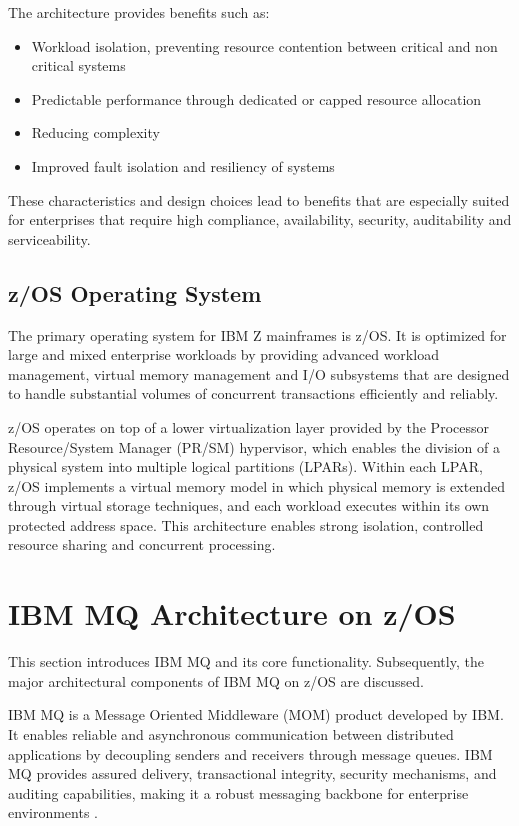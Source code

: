 The architecture provides benefits such as:
\begin{itemize}
    \item Workload isolation, preventing resource contention between critical and non critical systems
    \item Predictable performance through dedicated or capped resource allocation
    \item Reducing complexity
    \item Improved fault isolation and resiliency of systems
\end{itemize}

These characteristics and design choices lead to benefits that are especially suited for enterprises that require high compliance, availability, security, auditability and serviceability. 

\subsection{z/OS Operating System}%
\label{subsec:zos-architecture}

The primary operating system for IBM Z mainframes is z/OS. It is optimized for large and mixed enterprise workloads by providing advanced workload management, virtual memory management and I/O subsystems that are designed to handle substantial volumes of concurrent transactions efficiently and reliably. 

z/OS operates on top of a lower virtualization layer provided by the Processor Resource/System Manager (PR/SM) hypervisor, which enables the division of a physical system into multiple logical partitions (LPARs). Within each LPAR, z/OS implements a virtual memory model in which physical memory is extended through virtual storage techniques, and each workload executes within its own protected address space. This architecture enables strong isolation, controlled resource sharing and concurrent processing. \autocite{ibm2025_zos}

\section{IBM MQ Architecture on z/OS}%
\label{sec:mq-architecture}

This section introduces IBM MQ and its core functionality. Subsequently, the major architectural components of IBM MQ on z/OS are discussed.

IBM MQ is a Message Oriented Middleware (MOM) product developed by IBM. It enables reliable and asynchronous communication between distributed applications by decoupling senders and receivers through message queues. IBM MQ provides assured delivery, transactional integrity, security mechanisms, and auditing capabilities, making it a robust messaging backbone for enterprise environments \autocite{ibm2026_mq}.

